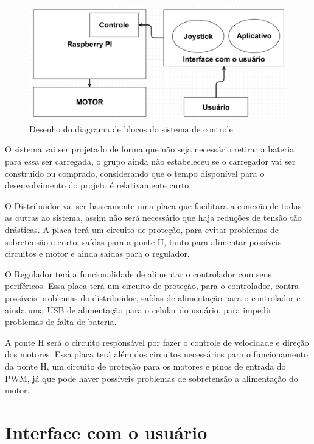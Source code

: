 \begin{figure}[!htb]
\centering
  \includegraphics[keepaspectratio=true,scale=0.6]{figuras/controle/diagrama_blocos}
\caption{Desenho do diagrama de blocos do sistema de controle}
\label{fig:diagrama_blocos}
\end{figure}

O sistema vai ser projetado de forma que não seja necessário retirar a bateria para essa ser carregada, o grupo ainda não estabeleceu se o carregador vai ser construído ou comprado, considerando que o tempo disponível para o desenvolvimento do projeto é relativamente curto.

O Distribuidor vai ser basicamente uma placa que facilitara a conexão de todas as outras ao sistema, assim não será necessário que haja reduções de tensão tão drásticas. A placa terá um circuito de proteção, para evitar problemas de sobretensão e curto, saídas para a ponte H, tanto para alimentar possíveis circuitos e motor e ainda saídas para o regulador.

O Regulador terá a funcionalidade de alimentar o controlador com seus periféricos. Essa placa terá um circuito de proteção, para o controlador, contra possíveis problemas do distribuidor, saídas de alimentação para o controlador e ainda uma USB de alimentação para o celular do usuário, para impedir problemas de falta de bateria.

A ponte H será o circuito responsável por fazer o controle de velocidade e direção dos motores. Essa placa terá além dos circuitos necessários para o funcionamento da ponte H, um circuito de proteção para os motores e pinos de entrada do PWM, já que pode haver possíveis problemas de sobretensão a alimentação do motor.


\section{Interface com o usuário}


